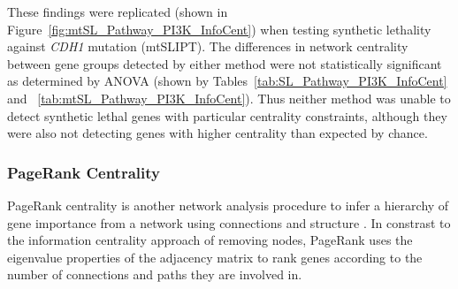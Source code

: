 \FloatBarrier

\begin{table*}[!htb]
\caption{\gls{ANOVA} for Synthetic Lethality and Information Centrality}
\label{tab:SL_Pathway_PI3K_InfoCent}
\noindent{}
\end{table*}

These findings were replicated (shown in Figure~\ref{fig:mtSL_Pathway_PI3K_InfoCent}) when testing synthetic lethality against \textit{CDH1} mutation (mtSLIPT). The differences in network centrality between gene groups detected by either method were not statistically significant as determined by \gls{ANOVA} (shown by Tables~\ref{tab:SL_Pathway_PI3K_InfoCent} and ~\ref{tab:mtSL_Pathway_PI3K_InfoCent}). Thus neither method was unable to detect synthetic lethal genes with particular centrality constraints, although they were also not detecting genes with higher centrality than expected by chance.



\FloatBarrier

\subsubsection{PageRank Centrality}  \label{chapt4:Network_PageRank}

\FloatBarrier

PageRank centrality is another network analysis procedure to infer a hierarchy of gene importance from a network using connections and structure \citep{Brin1998}. In constrast to the information centrality approach of removing nodes, PageRank uses the eigenvalue properties of the adjacency matrix to rank genes according to the number of connections and paths they are involved in. 

